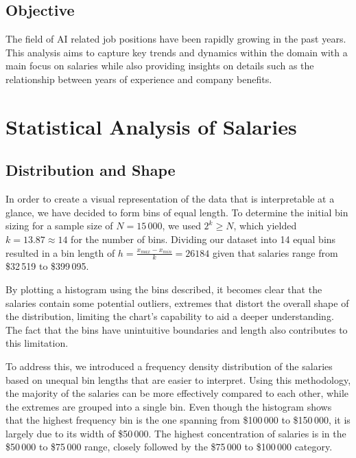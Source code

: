 \documentclass[12pt, a4paper, titlepage]{article}
\begin{document}
\subsection{Objective}
The field of AI related job positions have been rapidly growing in the past years. This analysis aims to capture key trends and dynamics within the domain with a main focus on salaries while also providing insights on details such as the relationship between years of experience and company benefits.

\section{Statistical Analysis of Salaries}

\subsection{Distribution and Shape}
In order to create a visual representation of the data that is interpretable at a glance, we have decided to form bins of equal length. To determine the initial bin sizing for a sample size of $N = 15\,000$, we used $2^k \geq N$, which yielded $k = 13.87 \approx 14$ for the number of bins. Dividing our dataset into 14 equal bins resulted in a bin length of $h = \frac{x_{max}-x_{min}}{k} = 26184$ given that salaries range from \$32\,519 to \$399\,095.

By plotting a histogram using the bins described, it becomes clear that the salaries contain some potential outliers, extremes that distort the overall shape of the distribution, limiting the chart's capability to aid a deeper understanding. The fact that the bins have unintuitive boundaries and length also contributes to this limitation.

To address this, we introduced a frequency density distribution of the salaries based on unequal bin lengths that are easier to interpret. Using this methodology, the majority of the salaries can be more effectively compared to each other, while the extremes are grouped into a single bin. Even though the histogram shows that the highest frequency bin is the one spanning from \$100\,000 to \$150\,000, it is largely due to its width of \$50\,000. The highest concentration of salaries is in the \$50\,000 to \$75\,000 range, closely followed by the \$75\,000 to \$100\,000 category.
\end{document}
